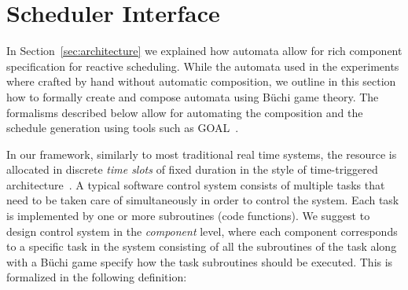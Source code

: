 \documentclass[ twoside, 12pt ]{article}
\newcommand{\buchi}{B\"uchi }
\begin{document}
\section{Scheduler Interface}
\label{sec:scheduler}
In Section~\ref{sec:architecture} we explained how automata allow for rich component specification for reactive scheduling. While the automata used in the experiments where crafted by hand without automatic composition, we outline in this section how to formally create and compose automata using \buchi game theory. The formalisms described below  allow for automating the composition and the schedule generation using tools such as GOAL~\cite{goal}.

In our framework, similarly to most traditional real time systems, the resource is allocated in discrete \textit{time slots} of fixed duration in the style of time-triggered architecture~\cite{RTComposer}. A typical software control system consists of multiple tasks that need to be taken care of simultaneously in order to control the system.
Each task is implemented by one or more subroutines (code functions). We suggest to design control system in the \textit{component} level, where each component corresponds to a specific task in the system consisting of all the subroutines of the task along with a \buchi game specify how the task subroutines should be executed. This is formalized in the following definition:
\end{document}
